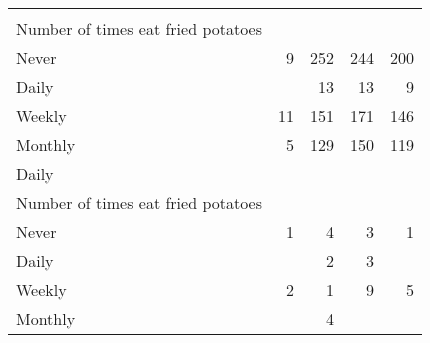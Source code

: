 \documentclass{article}
\begin{document}
\begin{tabular}{lllll}
  \multicolumn{1}{|r}{} &
  \multicolumn{1}{r}{} &
  \multicolumn{1}{r}{} &
  \multicolumn{1}{r}{} \\
\multicolumn{1}{l}{\hspace{4em}Number of times eat fried potatoes} &
  \multicolumn{1}{|r}{} &
  \multicolumn{1}{r}{} &
  \multicolumn{1}{r}{} &
  \multicolumn{1}{r}{} \\
\multicolumn{1}{l}{\hspace{5em}Never} &
  \multicolumn{1}{|r}{9} &
  \multicolumn{1}{r}{252} &
  \multicolumn{1}{r}{244} &
  \multicolumn{1}{r}{200} \\
\multicolumn{1}{l}{\hspace{5em}Daily} &
  \multicolumn{1}{|r}{} &
  \multicolumn{1}{r}{13} &
  \multicolumn{1}{r}{13} &
  \multicolumn{1}{r}{9} \\
\multicolumn{1}{l}{\hspace{5em}Weekly} &
  \multicolumn{1}{|r}{11} &
  \multicolumn{1}{r}{151} &
  \multicolumn{1}{r}{171} &
  \multicolumn{1}{r}{146} \\
\multicolumn{1}{l}{\hspace{5em}Monthly} &
  \multicolumn{1}{|r}{5} &
  \multicolumn{1}{r}{129} &
  \multicolumn{1}{r}{150} &
  \multicolumn{1}{r}{119} \\
\multicolumn{1}{l}{\hspace{3em}Daily} &
  \multicolumn{1}{|r}{} &
  \multicolumn{1}{r}{} &
  \multicolumn{1}{r}{} &
  \multicolumn{1}{r}{} \\
\multicolumn{1}{l}{\hspace{4em}Number of times eat fried potatoes} &
  \multicolumn{1}{|r}{} &
  \multicolumn{1}{r}{} &
  \multicolumn{1}{r}{} &
  \multicolumn{1}{r}{} \\
\multicolumn{1}{l}{\hspace{5em}Never} &
  \multicolumn{1}{|r}{1} &
  \multicolumn{1}{r}{4} &
  \multicolumn{1}{r}{3} &
  \multicolumn{1}{r}{1} \\
\multicolumn{1}{l}{\hspace{5em}Daily} &
  \multicolumn{1}{|r}{} &
  \multicolumn{1}{r}{2} &
  \multicolumn{1}{r}{3} &
  \multicolumn{1}{r}{} \\
\multicolumn{1}{l}{\hspace{5em}Weekly} &
  \multicolumn{1}{|r}{2} &
  \multicolumn{1}{r}{1} &
  \multicolumn{1}{r}{9} &
  \multicolumn{1}{r}{5} \\
\multicolumn{1}{l}{\hspace{5em}Monthly} &
  \multicolumn{1}{|r}{} &
  \multicolumn{1}{r}{4} &

\end{tabular}
\end{document}
